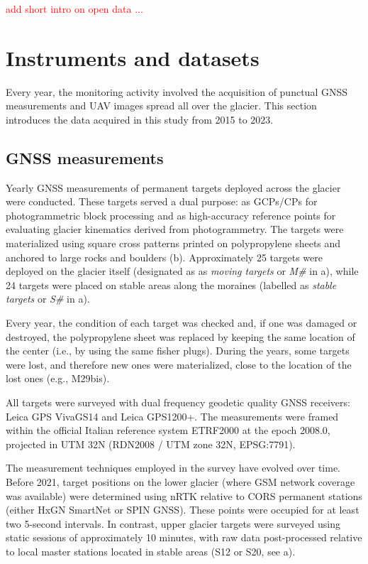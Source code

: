 \textcolor{red}{add short intro on open data ...}


\section{Instruments and datasets}\label{sec:3:instrument}

Every year, the monitoring activity involved the acquisition of punctual GNSS measurements 
and UAV images spread all over the glacier. 
This section introduces the data acquired in this study from 2015 to 2023.

\subsection{GNSS measurements}\label{sec:3:gnss}

Yearly GNSS measurements of permanent targets deployed across the glacier were conducted. 
These targets served a dual purpose: as GCPs/CPs for photogrammetric block processing and as high-accuracy 
reference points for evaluating glacier kinematics derived from photogrammetry. 
The targets were materialized using square cross patterns printed on polypropylene sheets and anchored to 
large rocks and boulders (b).
Approximately 25 targets were deployed on the glacier itself (designated as as \textit{moving targets} or 
\textit{M\#} in a), while 24 targets were placed on stable areas along the moraines 
(labelled as \textit{stable targets} or \textit{S\#} in a). 

Every year, the condition of each target was checked and, if one was damaged or
destroyed, the polypropylene sheet was replaced by keeping the same location of the
center (i.e., by using the same fisher plugs). 
During the years, some targets were lost, and therefore new ones were materialized, close 
to the location of the lost ones (e.g., M29bis).

All targets were surveyed with dual frequency geodetic quality GNSS receivers: 
Leica GPS VivaGS14 and Leica GPS1200+.
The measurements were framed within the official Italian reference system ETRF2000
at the epoch 2008.0, projected in UTM 32N (RDN2008 / UTM zone 32N, EPSG:7791).

The measurement techniques employed in the survey have evolved over time.
Before 2021, target positions on the lower glacier (where GSM network coverage was available) 
were determined using nRTK relative to CORS permanent stations (either HxGN SmartNet or SPIN GNSS).
These points were occupied for at least two 5-second intervals. 
In contrast, upper glacier targets were surveyed using static sessions of approximately 10 
minutes, with raw data post-processed relative to local master stations located in stable areas 
(S12 or S20, see a).

